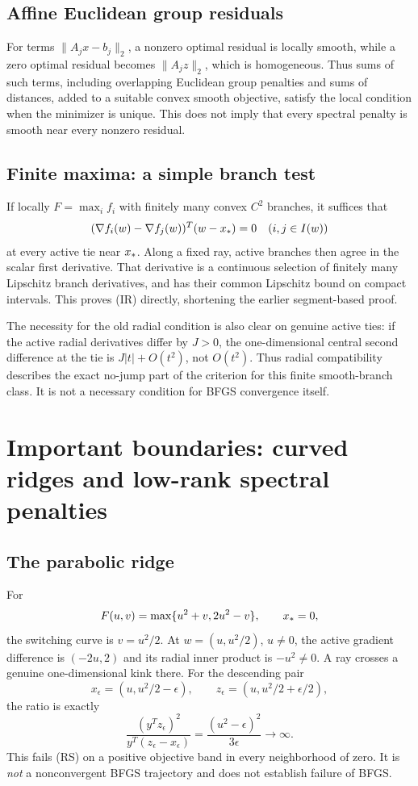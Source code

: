 \subsection{Affine Euclidean group residuals}
For terms $\|A_jx-b_j\|_2$, a nonzero optimal residual is locally smooth, while a zero optimal residual becomes $\|A_jz\|_2$, which is homogeneous. Thus sums of such terms, including overlapping Euclidean group penalties and sums of distances, added to a suitable convex smooth objective, satisfy the local condition when the minimizer is unique. This does not imply that every spectral penalty is smooth near every nonzero residual.

\subsection{Finite maxima: a simple branch test}
If locally $F=\max_i f_i$ with finitely many convex $C^2$ branches, it suffices that
\[
 (\nabla f_i(w)-\nabla f_j(w))^T(w-x_*)=0
 \quad(i,j\in I(w))
\]
at every active tie near $x_*$. Along a fixed ray, active branches then agree in the scalar first derivative. That derivative is a continuous selection of finitely many Lipschitz branch derivatives, and has their common Lipschitz bound on compact intervals. This proves (IR) directly, shortening the earlier segment-based proof.

The necessity for the old radial condition is also clear on genuine active ties: if the active radial derivatives differ by $J>0$, the one-dimensional central second difference at the tie is $J|t|+O(t^2)$, not $O(t^2)$. Thus radial compatibility describes the exact no-jump part of the criterion for this finite smooth-branch class. It is not a necessary condition for BFGS convergence itself.


\setcounter{section}{6}
\setcounter{theorem}{0}
\setcounter{equation}{8}
\section{Important boundaries: curved ridges and low-rank spectral penalties}
\subsection{The parabolic ridge}
For
\[
 F(u,v)=\max\{u^2+v,2u^2-v\},\qquad x_*=0,
\]
the switching curve is $v=u^2/2$. At $w=(u,u^2/2)$, $u\ne0$, the active gradient difference is $(-2u,2)$ and its radial inner product is $-u^2\ne0$. A ray crosses a genuine one-dimensional kink there. For the descending pair
\[
 x_\epsilon=(u,u^2/2-\epsilon),\qquad
 z_\epsilon=(u,u^2/2+\epsilon/2),
\]
the ratio is exactly
\[
 \frac{(y^Tz_\epsilon)^2}{y^T(z_\epsilon-x_\epsilon)}
 =\frac{(u^2-\epsilon)^2}{3\epsilon}\to\infty.
\]
This fails (RS) on a positive objective band in every neighborhood of zero. It is \emph{not} a nonconvergent BFGS trajectory and does not establish failure of BFGS.

